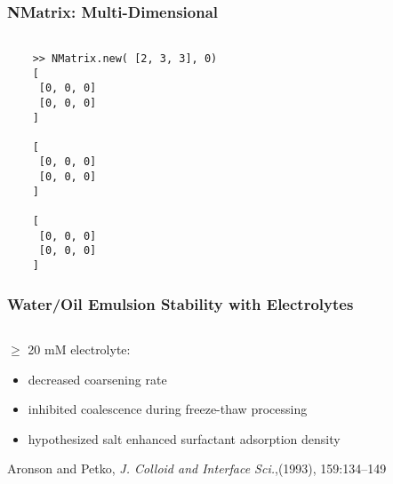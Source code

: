 \documentclass[10pt]{beamer}
\begin{document}
\begin{frame}[fragile]
  \frametitle{NMatrix: Multi-Dimensional}
  \begin{verbatim}

    >> NMatrix.new( [2, 3, 3], 0)
    [
     [0, 0, 0]
     [0, 0, 0]
    ]

    [
     [0, 0, 0]
     [0, 0, 0]
    ]

    [
     [0, 0, 0]
     [0, 0, 0]
    ]

  \end{verbatim}
\end{frame}


\begin{frame}
 \frametitle{Water/Oil Emulsion Stability with Electrolytes}
\begin{columns}

\begin{column}{0.5\textwidth}
$\geq$ 20 mM electrolyte: \\
\begin{itemize}
 \item decreased coarsening rate
\item inhibited coalescence during freeze-thaw processing
\item hypothesized salt enhanced surfactant adsorption density
\end{itemize}

\vspace{5mm}

Aronson and Petko, {\em J. Colloid and Interface Sci.},(1993), 159:134--149
 \end{column}

 \begin{column}{0.5\textwidth}
 \end{column}
\end{columns}

\end{frame}
\end{document}
